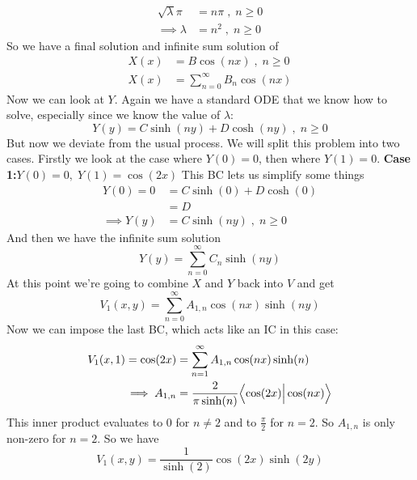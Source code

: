 \documentclass[12pt]{article}
\begin{document}
\begin{enumerate}
\begin{align*}
            \sqrt{\lambda}\pi&=n\pi\;,\;n\geq 0\\
            \implies \lambda&=n^2\;,\;n\geq 0
        \end{align*}
        So we have a final solution and infinite sum solution of 
        \begin{align*}
            X(x)&=B\cos(nx)\;,\;n\geq 0\\
            X(x)&=\sum_{n=0}^\infty B_n\cos(nx)
        \end{align*}
        Now we can look at $Y$. Again we have a standard ODE that we know how to solve, especially 
        since we know the value of $\lambda$:
        \begin{equation*}
            Y(y)=C\sinh(ny)+D\cosh(ny)\;,\;n\geq 0
        \end{equation*}
        But now we deviate from the usual process. We will split this problem into two cases. Firstly 
        we look at the case where $Y(0)=0$, then where $Y(1)=0$.\newline
        \textbf{Case 1:}$Y(0)=0,\;Y(1)=\cos(2x)$ This BC lets us simplify some things
        \begin{align*}
            Y(0)=0&=C\sinh(0)+D\cosh(0)\\
            &=D\\
            \implies Y(y)&=C\sinh(ny)\;,\;n\geq 0
        \end{align*}
        And then we have the infinite sum solution
        \begin{equation*}
            Y(y)=\sum_{n=0}^\infty C_n \sinh(ny)
        \end{equation*}
        At this point we're going to combine $X$ and $Y$ back into $V$ and get 
        \begin{equation*}
            V_1(x,y)=\sum_{n=0}^\infty A_{1,n}\cos(nx)\sinh(ny)
        \end{equation*}
        Now we can impose the last BC, which acts like an IC in this case:
        \begin{align*}
            V_1(x,1)=\cos(2x)&=\sum_{n=1}^\infty A_{1,n}\cos(nx)\sinh(n)\\
            \implies A_{1,n}&=\frac{2}{\pi\sinh(n)}\Bigl< \cos(2x) \Big| \cos(nx) \Bigr>
        \end{align*}
        This inner product evaluates to 0 for $n\neq2$ and to $\frac{\pi}{2}$ for $n=2$. So $A_{1,n}$ is 
        only non-zero for $n=2$. So we have 
        \begin{equation*}
            V_1(x,y)=\frac{1}{\sinh(2)}\cos(2x)\sinh(2y)

\end{equation*}
\end{enumerate}
\end{document}
